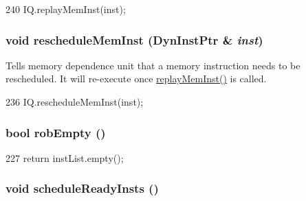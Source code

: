 \begin{DoxyCode}
240     { IQ.replayMemInst(inst); }
\end{DoxyCode}
\hypertarget{classBackEnd_aa9c46f45f491ef90a936c7e2b95f20aa}{
\subsubsection[{rescheduleMemInst}]{\setlength{\rightskip}{0pt plus 5cm}void rescheduleMemInst ({\bf DynInstPtr} \& {\em inst})}}
\label{classBackEnd_aa9c46f45f491ef90a936c7e2b95f20aa}
Tells memory dependence unit that a memory instruction needs to be rescheduled. It will re-\/execute once \hyperlink{classBackEnd_ae165df775b4de9e9430228c7f04c2bc9}{replayMemInst()} is called. 


\begin{DoxyCode}
236     { IQ.rescheduleMemInst(inst); }
\end{DoxyCode}
\hypertarget{classBackEnd_a5c38df1621043861ada4dd0939509869}{
\subsubsection[{robEmpty}]{\setlength{\rightskip}{0pt plus 5cm}bool robEmpty ()}}
\label{classBackEnd_a5c38df1621043861ada4dd0939509869}



\begin{DoxyCode}
227 { return instList.empty(); }
\end{DoxyCode}
\hypertarget{classBackEnd_a3694e72427d3a616808797f9343d1fc4}{
\subsubsection[{scheduleReadyInsts}]{\setlength{\rightskip}{0pt plus 5cm}void scheduleReadyInsts ()}}
\label{classBackEnd_a3694e72427d3a616808797f9343d1fc4}




